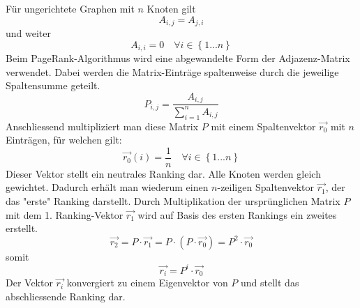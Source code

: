 Für ungerichtete Graphen mit $n$ Knoten gilt \begin{equation}A_{i,j}=A_{j,i}\end{equation} und weiter \begin{equation}A_{i,i}=0\quad\forall i\in \left\{1...n\right\}\end{equation}
Beim PageRank-Algorithmus wird eine abgewandelte Form der Adjazenz-Matrix verwendet.
Dabei werden die Matrix-Einträge spaltenweise durch die jeweilige Spaltensumme geteilt.
\begin{equation} P_{i,j}=\frac{A_{i,j}}{\sum_{i=1}^{n}A_{i,j}} \end{equation}
Anschliessend multipliziert man diese Matrix $P$ mit einem Spaltenvektor $\Vec{r_0}$ mit $n$ Einträgen, für welchen gilt:
\begin{equation} \Vec{r_0}(i) = \frac{1}{n} \quad\forall i\in \left\{1...n\right\} \end{equation}
Dieser Vektor stellt ein neutrales Ranking dar. Alle Knoten werden gleich gewichtet.
Dadurch erhält man wiederum einen $n$-zeiligen Spaltenvektor $\Vec{r_1}$, der das "erste" Ranking darstellt. Durch Multiplikation der ursprünglichen Matrix $P$ mit dem 1. Ranking-Vektor $\Vec{r_1}$ wird auf Basis des ersten Rankings ein zweites erstellt.
\begin{equation} \Vec{r_2} = P\cdot\Vec{r_1} = P\cdot(P\cdot\Vec{r_0}) = P^2\cdot\Vec{r_0}\end{equation}
somit
\begin{equation} \Vec{r_i} = P^i\cdot\Vec{r_0}\end{equation}
Der Vektor $\Vec{r_i}$ konvergiert zu einem Eigenvektor von $P$ und stellt das abschliessende Ranking dar.
